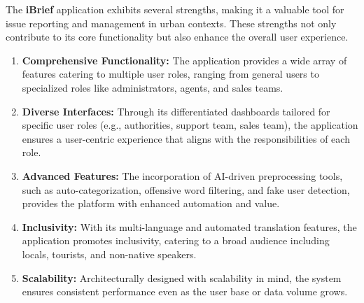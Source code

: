 The \textbf{iBrief} application exhibits several strengths, making it a valuable tool for issue reporting and management in urban contexts. These strengths not only contribute to its core functionality but also enhance the overall user experience.

\begin{enumerate}

    \item \textbf{Comprehensive Functionality:} The application provides a wide array of features catering to multiple user roles, ranging from general users to specialized roles like administrators, agents, and sales teams.

    \item \textbf{Diverse Interfaces:} Through its differentiated dashboards tailored for specific user roles (e.g., authorities, support team, sales team), the application ensures a user-centric experience that aligns with the responsibilities of each role.

    \item \textbf{Advanced Features:} The incorporation of AI-driven preprocessing tools, such as auto-categorization, offensive word filtering, and fake user detection, provides the platform with enhanced automation and value.

    \item \textbf{Inclusivity:} With its multi-language and automated translation features, the application promotes inclusivity, catering to a broad audience including locals, tourists, and non-native speakers.

    \item \textbf{Scalability:} Architecturally designed with scalability in mind, the system ensures consistent performance even as the user base or data volume grows.

\end{enumerate}
